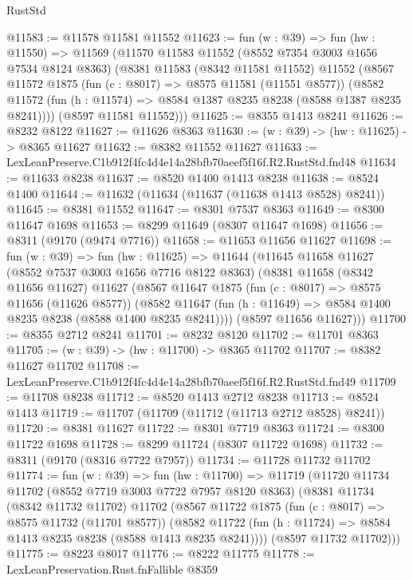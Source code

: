 \begin{lexlean}{RustStd}
\begin{coremodule}
@11583 := @11578 @11581 @11552
@11623 := fun (w : @39) =>
  fun (hw : @11550) =>
  @11569
    (@11570
      @11583
      @11552
      (@8552 @7354 @3003 @1656 @7534 @8124 @8363)
      (@8381
        @11583
        (@8342 @11581 @11552)
        @11552
        (@8567
          @11572
          @1875
          (fun (c : @8017) => @8575 @11581 (@11551 @8577))
          (@8582 @11572 (fun (h : @11574) => @8584 @1387 @8235 @8238 (@8588 @1387 @8235 @8241))))
        (@8597 @11581 @11552)))
@11625 := @8355 @1413 @8241
@11626 := @8232 @8122
@11627 := @11626 @8363
@11630 := (w : @39) -> (hw : @11625) -> @8365 @11627
@11632 := @8382 @11552 @11627
@11633 := LexLeanPreserve.C1b912f4fc4d4e14a28bfb70aeef5f16f.R2.RustStd.fnd48
@11634 := @11633 @8238
@11637 := @8520 @1400 @1413 @8238
@11638 := @8524 @1400
@11644 := @11632 (@11634 (@11637 (@11638 @1413 @8528) @8241))
@11645 := @8381 @11552
@11647 := @8301 @7537 @8363
@11649 := @8300 @11647 @1698
@11653 := @8299 @11649 (@8307 @11647 @1698)
@11656 := @8311 (@9170 (@9474 @7716))
@11658 := @11653 @11656 @11627
@11698 := fun (w : @39) =>
  fun (hw : @11625) =>
  @11644
    (@11645
      @11658
      @11627
      (@8552 @7537 @3003 @1656 @7716 @8122 @8363)
      (@8381
        @11658
        (@8342 @11656 @11627)
        @11627
        (@8567
          @11647
          @1875
          (fun (c : @8017) => @8575 @11656 (@11626 @8577))
          (@8582 @11647 (fun (h : @11649) => @8584 @1400 @8235 @8238 (@8588 @1400 @8235 @8241))))
        (@8597 @11656 @11627)))
@11700 := @8355 @2712 @8241
@11701 := @8232 @8120
@11702 := @11701 @8363
@11705 := (w : @39) -> (hw : @11700) -> @8365 @11702
@11707 := @8382 @11627 @11702
@11708 := LexLeanPreserve.C1b912f4fc4d4e14a28bfb70aeef5f16f.R2.RustStd.fnd49
@11709 := @11708 @8238
@11712 := @8520 @1413 @2712 @8238
@11713 := @8524 @1413
@11719 := @11707 (@11709 (@11712 (@11713 @2712 @8528) @8241))
@11720 := @8381 @11627
@11722 := @8301 @7719 @8363
@11724 := @8300 @11722 @1698
@11728 := @8299 @11724 (@8307 @11722 @1698)
@11732 := @8311 (@9170 (@8316 @7722 @7957))
@11734 := @11728 @11732 @11702
@11774 := fun (w : @39) =>
  fun (hw : @11700) =>
  @11719
    (@11720
      @11734
      @11702
      (@8552 @7719 @3003 @7722 @7957 @8120 @8363)
      (@8381
        @11734
        (@8342 @11732 @11702)
        @11702
        (@8567
          @11722
          @1875
          (fun (c : @8017) => @8575 @11732 (@11701 @8577))
          (@8582 @11722 (fun (h : @11724) => @8584 @1413 @8235 @8238 (@8588 @1413 @8235 @8241))))
        (@8597 @11732 @11702)))
@11775 := @8223 @8017
@11776 := @8222 @11775
@11778 := LexLeanPreservation.Rust.fnFallible @8359

\end{coremodule}
\end{lexlean}
